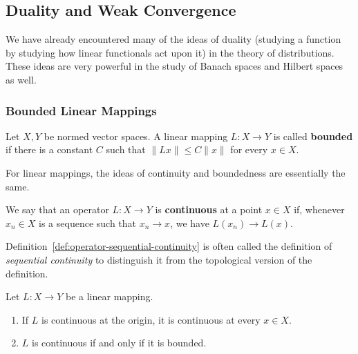 \subsection{Duality and Weak Convergence}\label{sec:duality-weak-convergence}

We have already encountered many of the ideas of duality (studying a function by studying how linear functionals act upon it) in the theory of distributions. These ideas are very powerful in the study of Banach spaces and Hilbert spaces as well.

\subsubsection{Bounded Linear Mappings}\label{subsec:bounded-linear-mappings}

\begin{Definition}
\label{def:bounded-linear-mapping}
Let $X,Y$ be normed vector spaces. A linear mapping $L:X\to Y$ is called \textbf{bounded} if there is a constant $C$ such that $\|Lx\|\leq C\|x\|$ for every $x\in X$.
\end{Definition}

For linear mappings, the ideas of continuity and boundedness are essentially the same.

\begin{Definition}
\label{def:operator-sequential-continuity}
We say that an operator $L:X\to Y$ is \textbf{continuous} at a point $x\in X$ if, whenever $x_n\in X$ is a sequence such that $x_n\to x$, we have $L(x_n)\to L(x)$.
\end{Definition}

\begin{Remark}
\label{rem:sequential-versus-topological-continuity}
Definition~\ref{def:operator-sequential-continuity} is often called the definition of \emph{sequential continuity} to distinguish it from the topological version of the definition.
\end{Remark}

\begin{Lemma}
\label{lem:linear-mapping-bounded-continuity-equivalence}
Let $L:X\to Y$ be a linear mapping.\begin{enumerate}
\item If $L$ is continuous at the origin, it is continuous at every $x\in X$.
\item $L$ is continuous if and only if it is bounded.
\end{enumerate}
\end{Lemma}

